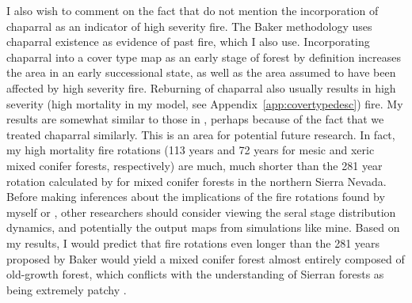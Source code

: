 I also wish to comment on the fact that \citet{Fule2014} do not mention the incorporation of chaparral as an indicator of high severity fire. The Baker methodology uses chaparral existence as evidence of past fire, which I also use. Incorporating chaparral into a cover type map as an early stage of forest by definition increases the area in an early successional state, as well as the area assumed to have been affected by high severity fire. Reburning of chaparral also usually results in high severity (high mortality in my model, see Appendix~\ref{app:covertypedesc}) fire. My results are somewhat similar to those in \citet{Baker2014}, perhaps because of the fact that we treated chaparral similarly. This is an area for potential future research. In fact, my high mortality fire rotations (113 years and 72 years for mesic and xeric mixed conifer forests, respectively) are much, much shorter than the 281 year rotation calculated by \citet{Baker2014} for mixed conifer forests in the northern Sierra Nevada. Before making inferences about the implications of the fire rotations found by myself or \citet{Baker2014}, other researchers should consider viewing the seral stage distribution dynamics, and potentially the output maps from simulations like mine. Based on my results, I would predict that fire rotations even longer than the 281 years proposed by Baker would yield a mixed conifer forest almost entirely composed of old-growth forest, which conflicts with the understanding of Sierran forests as being extremely patchy \citep{Franklin1996,SNEP1996}. 

